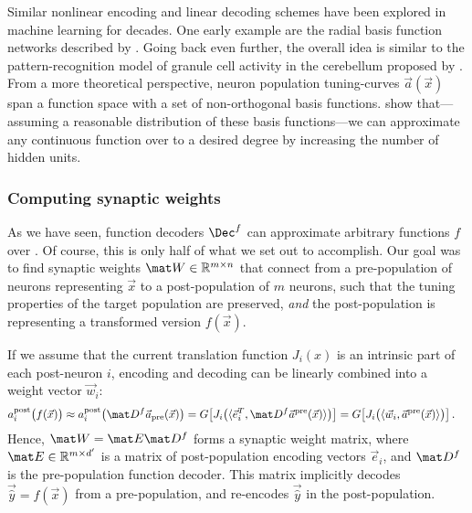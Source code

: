Similar nonlinear encoding and linear decoding schemes have been explored in machine learning for decades.
One early example are the radial basis function networks described by \citet{broomhead1988radial}.
Going back even further, the overall idea is similar to the pattern-recognition model of granule cell activity in the cerebellum proposed by \citet{marr1969theory}.
From a more theoretical perspective, neuron population tuning-curves $\vec a(\vec x)$ span a function space with a set of non-orthogonal basis functions. 
\citet{hornik1989multilayer} show that---assuming a reasonable distribution of these basis functions---we can approximate any continuous function over \Xrepr to a desired degree by increasing the number of hidden units.

\subsubsection{Computing synaptic weights}
As we have seen, function decoders $\Dec^f$ can approximate arbitrary functions $f$ over \Xrepr.
Of course, this is only half of what we set out to accomplish.
Our goal was to find synaptic weights $\mat W \in \mathbb{R}^{m \times n}$ that connect from a pre-population of \Npop neurons representing $\vec x$ to a post-population of $m$ neurons, such that the tuning properties of the target population are preserved, \emph{and} the post-population is representing a transformed version $f(\vec x)$.

If we assume that the current translation function $J_i(x)$ is an intrinsic part of each post-neuron $i$, encoding and decoding can be linearly combined into a weight vector $\vec w_i$:
\begin{align}
	a_i^\mathrm{post}\bigl(f(\vec x)\bigr)
		&\approx
	a_i^\mathrm{post}\bigl(\mat D^f \vec a_\mathrm{pre}(\vec x)\bigr)
		=	
	G\bigl[J_i\bigl(\langle \vec e_i^T, \mat D^f \vec a^\mathrm{pre}(\vec x)\rangle \bigr)\bigr]
		=
	G\bigl[J_i\bigl(\langle \vec w_i, \vec a^\mathrm{pre}(\vec x) \rangle \bigr)\bigr] \,.
	\label{eqn:nef_weight_vector}
\end{align}
Hence, $\mat W = \mat E \mat D^f$ forms a synaptic weight matrix, where $\mat E \in \mathbb{R}^{m \times d'}$ is a matrix of post-population encoding vectors $\vec e_i$, and $\mat D^f$ is the pre-population function decoder.
This matrix implicitly decodes $\vec{\hat y} = f(\vec x)$ from a pre-population, and re-encodes $\vec{\hat y}$ in the post-population.

